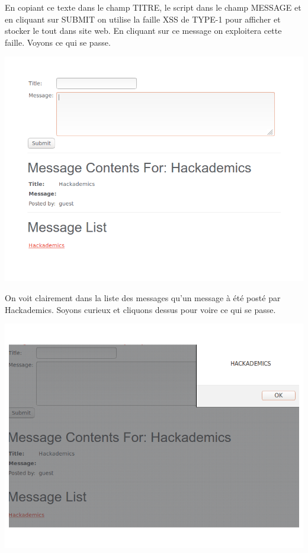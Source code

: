 \begin{flushleft}
En copiant ce texte dans le champ TITRE, le script dans le champ MESSAGE et  en cliquant sur SUBMIT on utilise la faille XSS de TYPE-1 pour afficher et stocker le tout dans site web. En cliquant sur ce message on exploitera cette faille. Voyons ce qui se passe.
\end{flushleft}


\begin{center}
\includegraphics[scale=0.3]{Web/assets/xsst1-1.png}
\end{center}

\bigskip

\begin{flushleft}
On voit clairement dans la liste des messages qu'un message à été posté par Hackademics. Soyons curieux et cliquons dessus pour voire ce qui se passe.
\end{flushleft}

\begin{center}
\includegraphics[scale=0.3]{Web/assets/xsst1-2.png}
\end{center}

